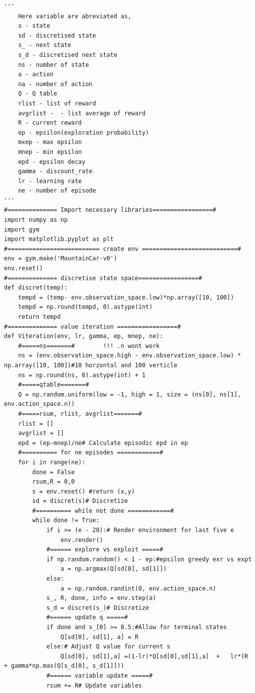 \begin{verbatim}
'''
    Here variable are abreviated as,
    s - state
    sd - discretised state
    s_ - next state
    s_d - discretised next state
    ns - number of state
    a - action
    na - number of action
    Q - Q table
    rlist - list of reward
    avgrlist -  - list average of reward
    R - current reward
    ep - epsilon(exploration probability)
    mxep - max epsilon
    mnep - min epsilon
    epd - epsilon decay
    gamma - discount_rate
    lr - learning rate
    ne - number of episode
'''
#============== Import necessary libraries=================#
import numpy as np
import gym
import matplotlib.pyplot as plt
#========================== create env ===========================#
env = gym.make('MountainCar-v0')
env.reset()
#============== discretise state space=================#
def discret(temp):
    tempd = (temp- env.observation_space.low)*np.array([10, 100])
    tempd = np.round(tempd, 0).astype(int)
    return tempd
#============== value iteration =================#
def Viteration(env, lr, gamma, ep, mnep, ne):
    #=====ns=======#        !!! .n wont work
    ns = (env.observation_space.high - env.observation_space.low) * np.array([10, 100])#10 horzontal and 100 verticle
    ns = np.round(ns, 0).astype(int) + 1
    #=====qtable=======#
    Q = np.random.uniform(low = -1, high = 1, size = (ns[0], ns[1], env.action_space.n))
    #=====rsum, rlist, avgrlist=======#
    rlist = []
    avgrlist = []
    epd = (ep-mnep)/ne# Calculate episodic epd in ep
    #========== for ne episodes ============#
    for i in range(ne):
        done = False
        rsum,R = 0,0
        s = env.reset() #return (x,y)
        sd = discret(s)# Discretize
        #========== while not done ============#
        while done != True:
            if i >= (e - 20):# Render environment for last five e
                env.render()
            #====== explore vs exploit =====#
            if np.random.random() < 1 - ep:#epsilon greedy exr vs expt
                a = np.argmax(Q[sd[0], sd[1]]) 
            else:
                a = np.random.randint(0, env.action_space.n)
            s_, R, done, info = env.step(a) 
            s_d = discret(s_)# Discretize
            #====== update q =====#
            if done and s_[0] >= 0.5:#Allow for terminal states
                Q[sd[0], sd[1], a] = R
            else:# Adjust Q value for current s
                Q[sd[0], sd[1],a] =(1-lr)*Q[sd[0],sd[1],a]  +   lr*(R + gamma*np.max(Q[s_d[0], s_d[1]]))
            #====== variable update =====#
            rsum += R# Update variables

\end{verbatim}

